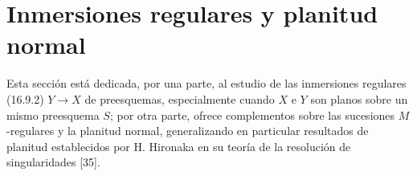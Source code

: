 \section{Inmersiones regulares y planitud normal}
\label{section:IV.19}

Esta sección está dedicada, por una parte, al estudio de las inmersiones regulares (16.9.2) $Y\to X$ de preesquemas, especialmente cuando $X$ e $Y$ son planos sobre un mismo preesquema $S$; por otra parte, ofrece complementos sobre las sucesiones $M$-regulares y la planitud normal, generalizando en particular resultados de planitud establecidos por H. Hironaka en su teoría de la resolución de singularidades [35].
